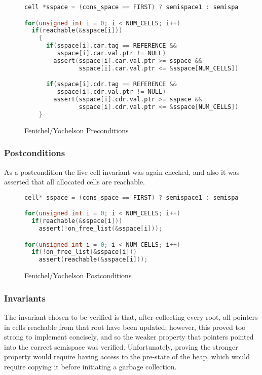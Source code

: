 \begin{figure}[H]
  \begin{lstlisting}[language=C]
cell *sspace = (cons_space == FIRST) ? semispace1 : semispace2;

for(unsigned int i = 0; i < NUM_CELLS; i++)
  if(reachable(&sspace[i]))
    {
      if(sspace[i].car.tag == REFERENCE &&
         sspace[i].car.val.ptr != NULL)
        assert(sspace[i].car.val.ptr >= sspace &&
               sspace[i].car.val.ptr <= &sspace[NUM_CELLS]);

      if(sspace[i].cdr.tag == REFERENCE &&
         sspace[i].cdr.val.ptr != NULL)
        assert(sspace[i].cdr.val.ptr >= sspace &&
               sspace[i].cdr.val.ptr <= &sspace[NUM_CELLS]);
    }
  \end{lstlisting}
  \captionsetup{format=default}
  \caption{Fenichel/Yochelson Preconditions}
\end{figure}

\subsubsection{Postconditions}
\label{sec:results-impl-c-post}

As a postcondition the live cell invariant was again checked, and also
it was asserted that all allocated cells are reachable.

\begin{figure}[H]
  \begin{lstlisting}[language=C]
cell* sspace = (cons_space == FIRST) ? semispace1 : semispace2;

for(unsigned int i = 0; i < NUM_CELLS; i++)
  if(reachable(&sspace[i]))
    assert(!on_free_list(&sspace[i]));

for(unsigned int i = 0; i < NUM_CELLS; i++)
  if(!on_free_list(&sspace[i]))
    assert(reachable(&sspace[i]));
  \end{lstlisting}
  \captionsetup{format=default}
  \caption{Fenichel/Yochelson Postconditions}
\end{figure}

\subsubsection{Invariants}
\label{sec:results-impl-c-invariants}

The invariant chosen to be verified is that, after collecting every
root, all pointers in cells reachable from that root have been
updated; however, this proved too strong to implement concisely, and
so the weaker property that pointers pointed into the correct
semispace was verified. Unfortunately, proving the stronger property
would require having access to the pre-state of the heap, which would
require copying it before initiating a garbage collection.

